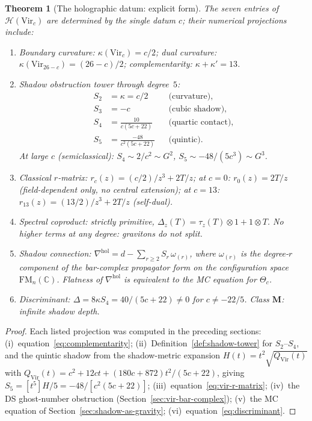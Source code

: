 \documentclass[11pt,reqno]{amsart}
\newtheorem{theorem}{Theorem}[section]
\theoremstyle{definition}
\theoremstyle{remark}
\begin{document}
\begin{theorem}[The holographic datum: explicit form]
\label{thm:holographic-explicit}
The seven entries of\/ $\mathcal{H}(\mathrm{Vir}_c)$ are determined
by the single datum $c$; their numerical projections include:
\begin{enumerate}[label=\textup{(\roman*)}]
\item Boundary curvature:
  $\kappa(\mathrm{Vir}_c) = c/2$;
  dual curvature:
  $\kappa(\mathrm{Vir}_{26-c}) = (26-c)/2$;
  complementarity:
  $\kappa + \kappa' = 13$.
\item Shadow obstruction tower through degree~$5$:
  \begin{align}
  S_2 &= \kappa = c/2 & &\text{(curvature)},
    \label{eq:hol-S2}\\
  S_3 &= -c & &\text{(cubic shadow)},
    \label{eq:hol-S3}\\
  S_4 &= \frac{10}{c(5c+22)} & &\text{(quartic contact)},
    \label{eq:hol-S4}\\
  S_5 &= \frac{-48}{c^2(5c+22)} & &\text{(quintic)}.
    \label{eq:hol-S5}
  \end{align}
  At large $c$ (semiclassical):
  $S_4 \sim 2/c^2 \sim G^2$,
  $S_5 \sim -48/(5c^3) \sim G^3$.
\item Classical $r$-matrix:
  $r_c(z) = (c/2)/z^3 + 2T/z$;
  at $c = 0$: $r_0(z) = 2T/z$ (field-dependent only, no central
  extension);
  at $c = 13$: $r_{13}(z) = (13/2)/z^3 + 2T/z$ (self-dual).
\item Spectral coproduct: strictly primitive,
  $\Delta_z(T) = \tau_z(T) \otimes 1 + 1 \otimes T$.
  No higher terms at any degree: gravitons do not split.
\item Shadow connection:
  $\nabla^{\mathrm{hol}} = d - \sum_{r \ge 2} S_r\,
  \omega_{(r)}$,
  where $\omega_{(r)}$ is the degree-$r$ component of the
  bar-complex propagator form on the configuration space
  $\mathrm{FM}_n(\mathbb{C})$.
  Flatness of $\nabla^{\mathrm{hol}}$ is equivalent to the
  MC equation for $\Theta_c$.
\item Discriminant: $\Delta = 8\kappa S_4
  = 40/(5c+22) \ne 0$ for $c \ne -22/5$. Class $\mathbf{M}$:
  infinite shadow depth.
\end{enumerate}
\end{theorem}

\begin{proof}
Each listed projection was computed in the preceding sections:
(i)~equation~\eqref{eq:complementarity};
(ii)~Definition~\ref{def:shadow-tower} for $S_2$--$S_4$, and
the quintic shadow from the shadow-metric expansion
$H(t) = t^2\sqrt{Q_{\mathrm{Vir}}(t)}$ with
$Q_{\mathrm{Vir}}(t) = c^2 + 12ct + (180c+872)t^2/(5c+22)$,
giving $S_5 = [t^5]H/5 = -48/[c^2(5c+22)]$;
(iii)~equation~\eqref{eq:vir-r-matrix};
(iv)~the DS ghost-number obstruction
(Section~\ref{sec:vir-bar-complex});
(v)~the MC equation of Section~\ref{sec:shadow-as-gravity};
(vi)~equation~\eqref{eq:discriminant}.
\end{proof}
\end{document}
